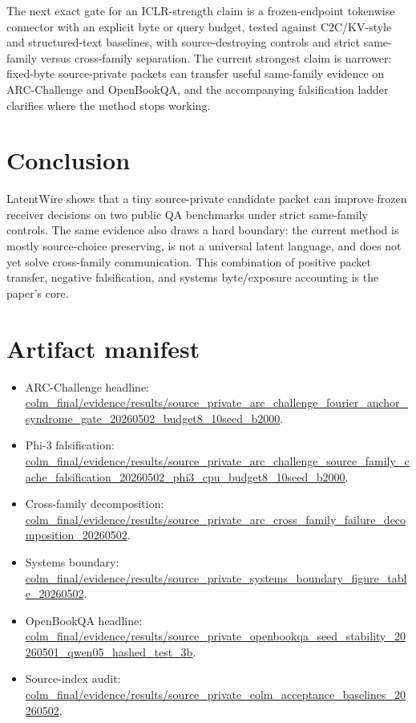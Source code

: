 \documentclass{article}
\newcommand{\method}{LatentWire}
\newcommand{\arc}{ARC-Challenge}
\newcommand{\obqa}{OpenBookQA}
\begin{document}
The next exact gate for an ICLR-strength claim is a frozen-endpoint tokenwise connector with an explicit byte or query budget, tested against C2C/KV-style and structured-text baselines, with source-destroying controls and strict same-family versus cross-family separation. The current strongest claim is narrower: fixed-byte source-private packets can transfer useful same-family evidence on \arc{} and \obqa{}, and the accompanying falsification ladder clarifies where the method stops working.

\section{Conclusion}

\method{} shows that a tiny source-private candidate packet can improve frozen receiver decisions on two public QA benchmarks under strict same-family controls. The same evidence also draws a hard boundary: the current method is mostly source-choice preserving, is not a universal latent language, and does not yet solve cross-family communication. This combination of positive packet transfer, negative falsification, and systems byte/exposure accounting is the paper's core.




\appendix

\section{Artifact manifest}

\begin{itemize}
\item \arc{} headline: \url{colm_final/evidence/results/source_private_arc_challenge_fourier_anchor_syndrome_gate_20260502_budget8_10seed_b2000}.
\item Phi-3 falsification: \url{colm_final/evidence/results/source_private_arc_challenge_source_family_cache_falsification_20260502_phi3_cpu_budget8_10seed_b2000}.
\item Cross-family decomposition: \url{colm_final/evidence/results/source_private_arc_cross_family_failure_decomposition_20260502}.
\item Systems boundary: \url{colm_final/evidence/results/source_private_systems_boundary_figure_table_20260502}.
\item \obqa{} headline: \url{colm_final/evidence/results/source_private_openbookqa_seed_stability_20260501_qwen05_hashed_test_3b}.
\item Source-index audit: \url{colm_final/evidence/results/source_private_colm_acceptance_baselines_20260502}.
\end{itemize}
\end{document}

